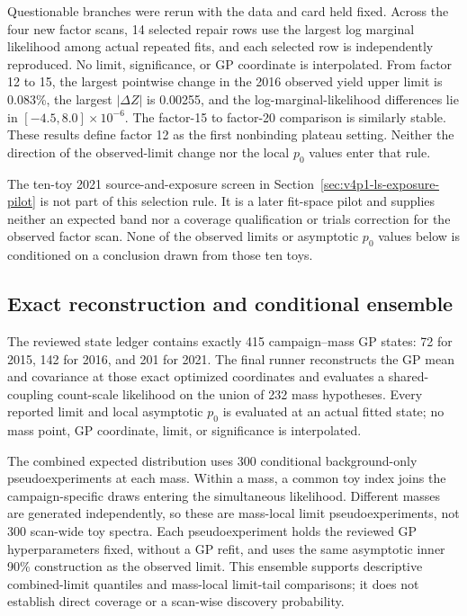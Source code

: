 Questionable branches were rerun with the data and card held fixed. Across the four
new factor scans, 14 selected repair rows use the largest log marginal likelihood
among actual repeated fits, and each selected row is independently reproduced. No
limit, significance, or GP coordinate is interpolated. From factor 12 to 15, the
largest pointwise change in the 2016 observed yield upper limit is 0.083\%, the
largest $|\Delta Z|$ is 0.00255, and the log-marginal-likelihood differences lie in
$[-4.5,8.0]\times10^{-6}$. The factor-15 to factor-20 comparison is similarly
stable. These results define factor 12 as the first nonbinding plateau setting.
Neither the direction of the observed-limit change nor the local $p_0$ values
enter that rule.

The ten-toy 2021 source-and-exposure screen in
Section~\ref{sec:v4p1-ls-exposure-pilot} is not part of this selection rule. It is
a later fit-space pilot and supplies neither an expected band nor a coverage
qualification or trials correction for the observed factor scan. None of the
observed limits or asymptotic $p_0$ values below is conditioned on a conclusion
drawn from those ten toys.

\subsection{Exact reconstruction and conditional ensemble}
\label{sec:results-v4p2-reconstruction}

The reviewed state ledger contains exactly 415 campaign--mass GP states: 72 for
2015, 142 for 2016, and 201 for 2021. The final runner reconstructs the GP mean
and covariance at those exact optimized coordinates and evaluates a shared-coupling
count-scale likelihood on the union of 232 mass hypotheses. Every
reported limit and local asymptotic $p_0$ is evaluated at an actual fitted state;
no mass point, GP coordinate, limit, or significance is interpolated.

The combined expected distribution uses 300 conditional background-only
pseudoexperiments at each mass. Within a mass, a common toy index joins the
campaign-specific draws entering the simultaneous likelihood. Different masses
are generated independently, so these are mass-local limit pseudoexperiments,
not 300 scan-wide toy spectra. Each pseudoexperiment holds the reviewed GP
hyperparameters fixed, without a GP refit, and uses the same asymptotic inner
90\% \CLs{} construction as the observed limit. This ensemble supports
descriptive combined-limit quantiles and mass-local limit-tail comparisons; it
does not establish direct \CLs{} coverage or a scan-wise discovery probability.

